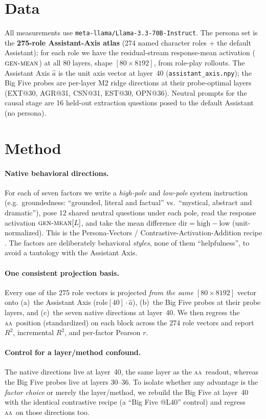 \documentclass[11pt]{article}
\renewcommand{\aa}{\textsc{aa}}
\newcommand{\R}{R^2}
\begin{document}
\section{Data}
All measurements use \texttt{meta-llama/Llama-3.3-70B-Instruct}. The persona set is
the \textbf{275-role Assistant-Axis atlas} (274 named character roles + the default
Assistant); for each role we have the residual-stream response-mean activation
($\textsc{gen-mean}$) at all 80 layers, shape $[80\times 8192]$, from role-play
rollouts. The Assistant Axis $\hat a$ is the unit axis vector at layer~40 (\texttt{assistant\_axis.npy});
the Big Five probes are per-layer M2 ridge directions at their probe-optimal layers
(EXT@30, AGR@31, CSN@31, EST@30, OPN@36). Neutral prompts for the causal stage are
16 held-out extraction questions posed to the default Assistant (no persona).

\section{Method}
\paragraph{Native behavioral directions.} For each of seven factors we write a
\emph{high-pole} and \emph{low-pole} system instruction (e.g.\ groundedness:
``grounded, literal and factual'' vs.\ ``mystical, abstract and dramatic''), pose 12
shared neutral questions under each pole, read the response activation
$\textsc{gen-mean}[L]$, and take the mean difference $\mathrm{dir}=\overline{\text{high}}-\overline{\text{low}}$
(unit-normalized). This is the Persona-Vectors / Contrastive-Activation-Addition
recipe \citep{personavectors,caa}. The factors are deliberately behavioral
\emph{styles}, none of them ``helpfulness'', to avoid a tautology with the Assistant
Axis.

\paragraph{One consistent projection basis.} Every one of the 275 role vectors is
projected \emph{from the same} $[80\times 8192]$ vector onto (a)~the Assistant Axis
($\text{role}[40]\cdot\hat a$), (b)~the Big Five probes at their probe layers, and
(c)~the seven native directions at layer~40. We then regress the \aa\ position
(standardized) on each block across the 274 role vectors and report $\R$, incremental
$\R$, and per-factor Pearson $r$.

\paragraph{Control for a layer/method confound.} The native directions live at
layer~40, the same layer as the \aa\ readout, whereas the Big Five probes live at
layers 30--36. To isolate whether any advantage is the \emph{factor choice} or merely
the layer/method, we rebuild the Big Five at layer~40 with the identical contrastive
recipe (a ``Big Five @L40'' control) and regress \aa\ on those directions too.
\end{document}
